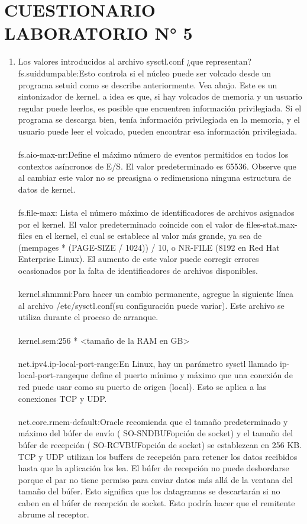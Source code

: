 \section{CUESTIONARIO LABORATORIO  N° 5} 

\begin{enumerate}[1.]
	\item  Los valores introducidos al archivo sysctl.conf ¿que representan?\\ 
	fs.suiddumpable:Esto controla si el núcleo puede ser volcado desde un programa setuid como se describe anteriormente. Vea abajo. Este es un sintonizador de kernel.
	a idea es que, si hay volcados de memoria y un usuario regular puede leerlos, es posible que encuentren información privilegiada. Si el programa se descarga bien, tenía información privilegiada en la memoria, y el usuario puede leer el volcado, pueden encontrar esa información privilegiada.\\
	\\ fs.aio-max-nr:Define el máximo número de eventos permitidos en todos los contextos asíncronos de E/S. El valor predeterminado es 65536. Observe que al cambiar este valor no se preasigna o redimensiona ninguna estructura de datos de kernel.\\
	\\ fs.file-max:
	Lista el número máximo de identificadores de archivos asignados por el kernel. El valor predeterminado coincide con el valor de files-stat.max-files en el kernel, el cual se establece al valor más grande, ya sea de (mempages * (PAGE-SIZE / 1024)) / 10, o NR-FILE (8192 en Red Hat Enterprise Linux). El aumento de este valor puede corregir errores ocasionados por la falta de identificadores de archivos disponibles.\\
	\\ kernel.shmmni:Para hacer un cambio permanente, agregue la siguiente línea al archivo /etc/sysctl.conf(su configuración puede variar). Este archivo se utiliza durante el proceso de arranque.\\
	\\ kernel.sem:256 * <tamaño de la RAM en GB>\\
	\\ net.ipv4.ip-local-port-range:En Linux, hay un parámetro sysctl llamado ip-local-port-rangeque define el puerto mínimo y máximo que una conexión de red puede usar como su puerto de origen (local). Esto se aplica a las conexiones TCP y UDP.\\
	\\ net.core.rmem-default:Oracle recomienda que el tamaño predeterminado y máximo del búfer de envío ( SO-SNDBUFopción de socket) y el tamaño del búfer de recepción ( SO-RCVBUFopción de socket) se establezcan en 256 KB. TCP y UDP utilizan los buffers de recepción para retener los datos recibidos hasta que la aplicación los lea. El búfer de recepción no puede desbordarse porque el par no tiene permiso para enviar datos más allá de la ventana del tamaño del búfer. Esto significa que los datagramas se descartarán si no caben en el búfer de recepción de socket. Esto podría hacer que el remitente abrume al receptor.\\

\end{enumerate}
